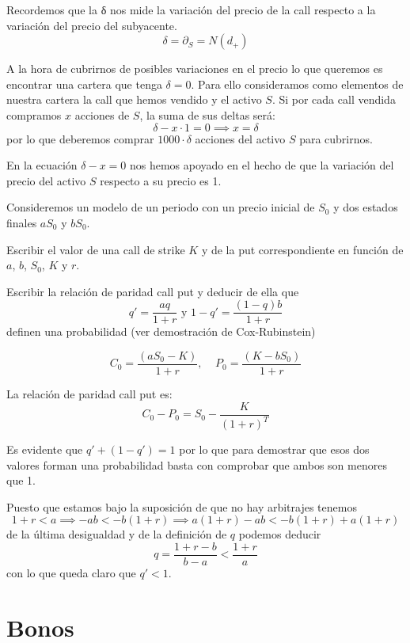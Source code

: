\begin{problem}[7]
Recordemos que la δ nos mide la variación del precio de la call respecto a la variación del precio del subyacente.
\[δ = \partial_S = N(d_+)\]

A la hora de cubrirnos de posibles variaciones en el precio lo que queremos es encontrar una cartera que tenga $δ=0$. Para ello consideramos como elementos de nuestra cartera la call que hemos vendido y el activo $S$. Si por cada call vendida compramos $x$ acciones de $S$, la suma de sus deltas será:
\[δ - x\cdot 1 = 0 \implies x = δ\]
por lo que deberemos comprar $1000\cdot δ$ acciones del activo $S$ para cubrirnos.

\obs En la ecuación $δ-x=0$ nos hemos apoyado en el hecho de que la variación del precio del activo $S$ respecto a su precio es 1.
\end{problem}

\begin{problem}[8]
Consideremos un modelo de un periodo con un precio inicial de $S_0$ y dos estados finales $aS_0$ y $bS_0$.

\ppart Escribir el valor de una call de strike $K$ y de la put correspondiente en función de $a$, $b$, $S_0$, $K$ y $r$.

\ppart
Escribir la relación de paridad call put y deducir de ella que
\[q' =\frac{aq}{1+r} \text{ y } 1-q'=\frac{(1-q)b}{1+r}\]
definen una probabilidad (ver demostración de Cox-Rubinstein)

\solution
{}

\spart
\[C_0 = \frac{(aS_0-K)}{1+r}, \;\;\;\; P_0 = \frac{(K-bS_0)}{1+r}\]

\spart

La relación de paridad call put es:
\[C_0 - P_0 = S_0-\frac{K}{(1+r)^T}\]

Es evidente que $q'+(1-q')=1$ por lo que para demostrar que esos dos valores forman una probabilidad basta con comprobar que ambos son menores que 1.

Puesto que estamos bajo la suposición de que no hay arbitrajes tenemos
\[1+r < a \implies -ab < -b(1+r) \implies a(1+r)-ab < -b(1+r)+a(1+r)\]
de la última desigualdad y de la definición de $q$ podemos deducir
\[q=\frac{1+r-b}{b-a} < \frac{1+r}{a}\]
con lo que queda claro que $q'<1$.
\end{problem}

\section{Bonos}

